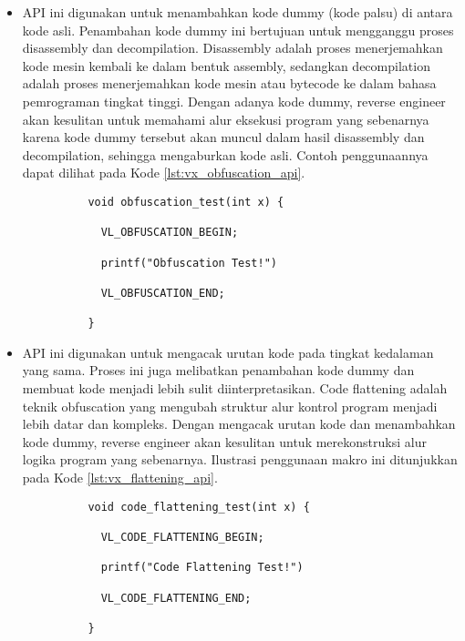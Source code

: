 \begin{itemize}
	\item {} API ini digunakan untuk menambahkan kode dummy (kode palsu) di antara kode asli. Penambahan kode dummy ini bertujuan untuk mengganggu proses disassembly dan decompilation. Disassembly adalah proses menerjemahkan kode mesin kembali ke dalam bentuk assembly, sedangkan decompilation adalah proses menerjemahkan kode mesin atau bytecode ke dalam bahasa pemrograman tingkat tinggi. Dengan adanya kode dummy, reverse engineer akan kesulitan untuk memahami alur eksekusi program yang sebenarnya karena kode dummy tersebut akan muncul dalam hasil disassembly dan decompilation, sehingga mengaburkan kode asli. Contoh penggunaannya dapat dilihat pada Kode \ref{lst:vx_obfuscation_api}.
	      \begin{verbatim}     
          void obfuscation_test(int x) {

            VL_OBFUSCATION_BEGIN;

            printf("Obfuscation Test!")

            VL_OBFUSCATION_END;

          }
    \end{verbatim}
    \label{lst:vx_obfuscation_api}

	\item {} API ini digunakan untuk mengacak urutan kode pada tingkat kedalaman yang sama. Proses ini juga melibatkan penambahan kode dummy dan membuat kode menjadi lebih sulit diinterpretasikan. Code flattening adalah teknik obfuscation yang mengubah struktur alur kontrol program menjadi lebih datar dan kompleks. Dengan mengacak urutan kode dan menambahkan kode dummy, reverse engineer akan kesulitan untuk merekonstruksi alur logika program yang sebenarnya. Ilustrasi penggunaan makro ini ditunjukkan pada Kode \ref{lst:vx_flattening_api}.
	      \begin{verbatim}     
          void code_flattening_test(int x) {

            VL_CODE_FLATTENING_BEGIN;

            printf("Code Flattening Test!")

            VL_CODE_FLATTENING_END;

          }
    \end{verbatim}
    \label{lst:vx_flattening_api}


\end{itemize}
